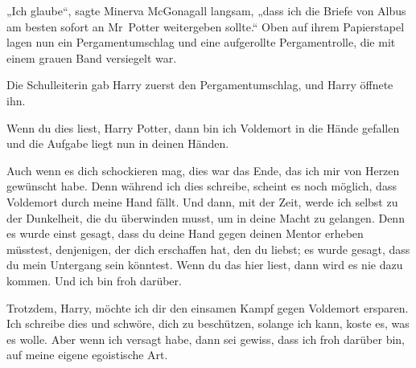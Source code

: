 „Ich glaube“, sagte Minerva McGonagall langsam, „dass ich die Briefe von Albus am besten sofort an Mr~Potter weitergeben sollte.“
Oben auf ihrem Papierstapel lagen nun ein Pergamentumschlag und eine aufgerollte Pergamentrolle, die mit einem grauen Band versiegelt war.

Die Schulleiterin gab Harry zuerst den Pergamentumschlag, und Harry öffnete ihn.

\later

\begin{writtenNote}
Wenn du dies liest, Harry Potter, dann bin ich Voldemort in die Hände gefallen und die Aufgabe liegt nun in deinen Händen.

Auch wenn es dich schockieren mag, dies war das Ende, das ich mir von Herzen gewünscht habe. Denn während ich dies schreibe, scheint es noch möglich, dass Voldemort durch meine Hand fällt. Und dann, mit der Zeit, werde ich selbst zu der Dunkelheit, die du überwinden musst, um in deine Macht zu gelangen. Denn es wurde einst gesagt, dass du deine Hand gegen deinen Mentor erheben müsstest, denjenigen, der dich erschaffen hat, den du liebst; es wurde gesagt, dass du mein Untergang sein könntest.
Wenn du das hier liest, dann wird es nie dazu kommen. Und ich bin froh darüber.

Trotzdem, Harry, möchte ich dir den einsamen Kampf gegen Voldemort ersparen.
Ich schreibe dies und schwöre, dich zu beschützen, solange ich kann, koste es, was es wolle. Aber wenn ich versagt habe, dann sei gewiss, dass ich froh darüber bin, auf meine eigene egoistische Art.


\end{writtenNote}
